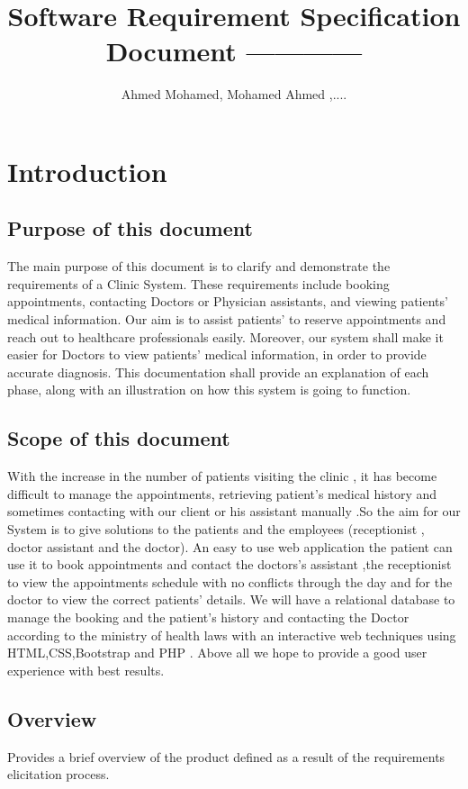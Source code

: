 \documentclass[]{article}
\title{Software Requirement Specification Document ------------ }
\author{Ahmed Mohamed, Mohamed Ahmed ,....}
\begin{document}
\maketitle

\section{Introduction}

\subsection{Purpose of this document}
The main purpose of this document is to clarify and demonstrate the requirements of a Clinic System. These requirements include booking appointments, contacting Doctors or Physician assistants, and viewing patients' medical information. Our aim is to assist patients' to reserve appointments and reach out to healthcare professionals easily. Moreover, our system shall make it easier for Doctors to view patients' medical information, in order to provide accurate diagnosis. This documentation shall provide an explanation of each phase, along with an illustration on how this system is going to function. 

\subsection{ Scope of this document}
With the increase in the number of patients visiting the clinic , it has become difficult to manage the appointments, retrieving patient's medical history and sometimes contacting with our client or his assistant manually .So the aim for our System is to give solutions to the patients and the employees (receptionist , doctor assistant and the doctor). An easy to use web application the patient can use it to book appointments and contact the doctors's assistant ,the receptionist to view the appointments schedule with no conflicts through the day and for the doctor to view the correct patients' details. We will have a relational database to manage the booking and the patient's history and contacting the Doctor according to the ministry of health laws with an interactive web techniques using HTML,CSS,Bootstrap and PHP . Above all we hope to provide a good user experience with best results. 


\subsection{Overview}
Provides a brief overview of the product defined as a result of the requirements elicitation process. 
\end{document}

